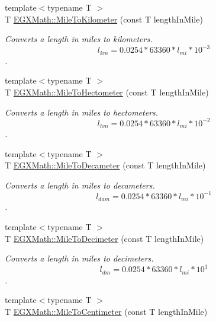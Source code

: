\begin{DoxyCompactItemize}
{\footnotesize template$<$typename T $>$ }\\T \mbox{\hyperlink{group___e_g_x_math-_conversions-_length_conversions-_imperial-_mile-_s_i_ga426c0a7ef1e87648941729c5447f0b07}{E\+G\+X\+Math\+::\+Mile\+To\+Kilometer}} (const T length\+In\+Mile)
\begin{DoxyCompactList}\small\item\em Converts a length in miles to kilometers. \[ l_{km}=0.0254 * 63360 * l_{mi} * 10^{-3} \]. \end{DoxyCompactList}\item 
{\footnotesize template$<$typename T $>$ }\\T \mbox{\hyperlink{group___e_g_x_math-_conversions-_length_conversions-_imperial-_mile-_s_i_ga34d371b17e63e2ed83787eab65b8dab9}{E\+G\+X\+Math\+::\+Mile\+To\+Hectometer}} (const T length\+In\+Mile)
\begin{DoxyCompactList}\small\item\em Converts a length in miles to hectometers. \[ l_{hm}=0.0254 * 63360 * l_{mi} * 10^{-2} \]. \end{DoxyCompactList}\item 
{\footnotesize template$<$typename T $>$ }\\T \mbox{\hyperlink{group___e_g_x_math-_conversions-_length_conversions-_imperial-_mile-_s_i_ga2f8705f9f0e67cce6a4e19c54ea907b0}{E\+G\+X\+Math\+::\+Mile\+To\+Decameter}} (const T length\+In\+Mile)
\begin{DoxyCompactList}\small\item\em Converts a length in miles to decameters. \[ l_{dam}=0.0254 * 63360 * l_{mi} * 10^{-1} \]. \end{DoxyCompactList}\item 
{\footnotesize template$<$typename T $>$ }\\T \mbox{\hyperlink{group___e_g_x_math-_conversions-_length_conversions-_imperial-_mile-_s_i_ga678ca464b305b9425fbec0b1f53fb983}{E\+G\+X\+Math\+::\+Mile\+To\+Decimeter}} (const T length\+In\+Mile)
\begin{DoxyCompactList}\small\item\em Converts a length in miles to decimeters. \[ l_{dm}=0.0254 * 63360 * l_{mi} * 10^{1} \]. \end{DoxyCompactList}\item 
{\footnotesize template$<$typename T $>$ }\\T \mbox{\hyperlink{group___e_g_x_math-_conversions-_length_conversions-_imperial-_mile-_s_i_gae846539455d87b5bc7b4af82c172f184}{E\+G\+X\+Math\+::\+Mile\+To\+Centimeter}} (const T length\+In\+Mile)

\end{DoxyCompactItemize}
